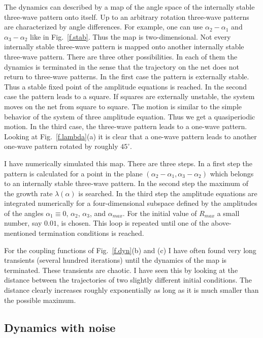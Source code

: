 The dynamics can described by a map of the angle space of the
internally stable three-wave pattern onto itself. Up to an arbitrary
rotation three-wave patterns are characterized by angle differences.
For example, one can use $\alpha_2-\alpha_1$ and $\alpha_3-\alpha_2$
like in Fig.~\ref{f.stab}. Thus the map is two-dimensional. Not every
internally stable three-wave pattern is mapped onto another
internally stable three-wave pattern. There are three other
possibilities. In each of them the dynamics is terminated in the sense
that the trajectory on the net does not return to three-wave
patterns. In the first case the pattern is externally stable. Thus a
stable fixed point of the amplitude equations is reached. In the
second case the pattern leads to a square. If squares are externally
unstable, the system moves on the net from square to square. The
motion is similar to the simple behavior of the system of three
amplitude equation.  Thus we get a quasiperiodic motion. In the third
case, the three-wave pattern leads to a one-wave pattern.  Looking at
Fig.~\ref{f.lambda}(a) it is clear that a one-wave pattern leads to
another one-wave pattern rotated by roughly $45^\circ$.

I have numerically simulated this map. There are three steps. In a
first step the pattern is calculated for a point in the plane 
$(\alpha_2-\alpha_1,\alpha_3-\alpha_2)$ which belongs to an 
internally stable three-wave pattern. In the second step the maximum
of the growth rate $\lambda(\alpha)$ is searched. In the third step
the amplitude equations are integrated numerically for a
four-dimensional subspace defined by the amplitudes of the angles
$\alpha_1\equiv 0$, $\alpha_2$, $\alpha_3$, and $\alpha_{max}$. For
the initial value of $R_{max}$ a small number, say $0.01$, is chosen.
This loop is repeated until one of the above-mentioned termination
conditions is reached.

For the coupling functions of Fig.~\ref{f.dyn}(b) and (c) I have
often found very long transients (several hundred iterations) until
the dynamics of the map is terminated. These transients are chaotic.
I have seen this by looking at the distance between the trajectories
of two slightly different initial conditions. The distance clearly
increases roughly exponentially as long as it is much smaller than
the possible maximum.

\subsection{\protect\label{NOIS}Dynamics with noise}

